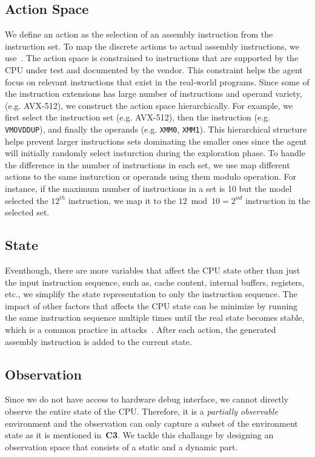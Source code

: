\subsection{Action Space} 
We define an action as the selection of an assembly instruction from the instruction set. To map the discrete actions to actual assembly instructions, we use~\cite{abel19a}.
The action space is constrained to instructions that are supported by the CPU under test and documented by the vendor. This constraint helps the agent focus on relevant instructions that exist in the real-world programs. Since some of the instruction extensions has large number of instructions and operand variety, (e.g. AVX-512), we construct the action space hierarchically. For example, we first select the instruction set (e.g. AVX-512), then the instruction (e.g. \texttt{VMOVDDUP}), and finally the operands (e.g. \texttt{XMM0}, \texttt{XMM1}). This hierarchical structure helps prevent larger instructions sets dominating the smaller ones since the agent will initially randomly select insturction during the exploration phase. To handle the difference in the number of instructions in each set, we use map different actions to the same insturction or operands using them modulo operation.
For instance, if the maximum number of instructions in a set is 10 but the model selected the $12^{th}$ instruction, we map it to the $12 \bmod 10 = 2^{nd}$ instruction in the selected set.



\subsection{State} Eventhough, there are more variables that affect the CPU state other than just the input instruction sequence, such as, cache content, internal buffers, registers, etc., we simplify the state representation to only the instruction sequence. The impact of other factors that affects the CPU state can be minimize by running the same instruction sequence multiple times until the real state becomes stable, which is a common practice in \Mi attacks~\cite{yarom2014flush+, liu2015last}. After each action, the generated assembly instruction is added to the current state.

\subsection{Observation} 
Since we do not have access to hardware debug interface, we cannot directly observe the entire state of the CPU. Therefore, it is a \textit{partially observable} environment and the observation can only capture a subset of the environment state as it is mentioned in~\textbf{C3}. We tackle this challange by designing an observation space that consists of a static and a dynamic part.

